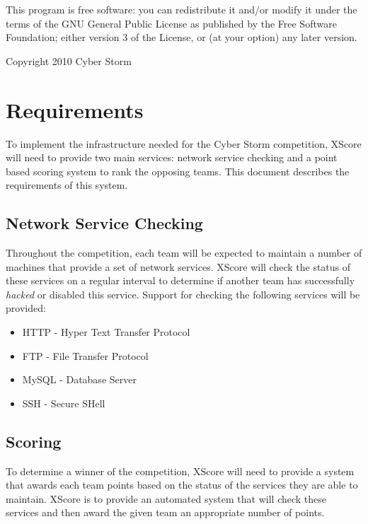 \documentclass[letterpaper,10pt,english]{manual}
\begin{document}
This program is free software: you can redistribute it and/or modify
it under the terms of the GNU General Public License as published by
the Free Software Foundation; either version 3 of the License, or
(at your option) any later version.

Copyright 2010 Cyber Storm

\resetcurrentobjects
\hypertarget{--doc-Requirements}{}

\chapter{Requirements}

To implement the infrastructure needed for the Cyber Storm competition, XScore
will need to provide two main services: network service checking and a
point based scoring system to rank the opposing teams.  This document
describes the requirements of this system.


\section{Network Service Checking}

Throughout the competition, each team will be expected to maintain a number of
machines that provide a set of network services.  XScore will check the status
of these services on a regular interval to determine if another team has
successfully \emph{hacked} or disabled this service.  Support for checking the
following services will be provided:
\begin{itemize}
\item {} 
HTTP - Hyper Text Transfer Protocol

\item {} 
FTP - File Transfer Protocol

\item {} 
MySQL - Database Server

\item {} 
SSH - Secure SHell

\end{itemize}


\section{Scoring}

To determine a winner of the competition, XScore will need to provide
a system that awards each team points based on the status of the services
they are able to maintain.  XScore is to provide an automated system that
will check these services and then award the given team an appropriate number
of points.
\end{document}
